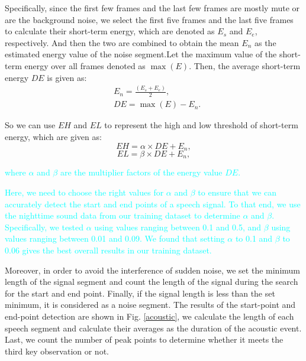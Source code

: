 Specifically, since the first few frames and the last few frames are mostly mute or are the background noise, we select the first five
frames and the last five frames to calculate their short-term energy, which are denoted as $E_s$ and $E_e$, respectively. And then the two
are combined to obtain the mean $E_n$ as the estimated energy value of the noise segment.Let the maximum value of the short-term energy
over all frames denoted as $\max (E)$. Then, the average short-term energy $DE$ is given as:
\begin{eqnarray}
      &E_n = \frac{(E_s+E_e)}{2}, \\
      &DE = \max (E)-E_n.\label{eq:DE}
\end{eqnarray}

So we can use $EH$ and $EL$ to represent the high and low threshold of short-term energy, which are given as:
\begin{equation}
      EH=\alpha \times DE+E_n,
\end{equation}
\begin{equation}
    EL=\beta \times DE+E_n,
\end{equation}

 \textcolor{cyan}{where $\alpha$ and $\beta$ are the multiplier factors of the energy value $DE$.}


\textcolor{cyan}{ Here, we need to choose the right values for $\alpha$ and $\beta$ to ensure
 that we can accurately detect the start and end points of a speech signal. To that end, we use the nighttime sound data from our training dataset to determine $\alpha$ and $\beta$.
 Specifically, we tested $\alpha$ using values ranging between 0.1 and 0.5, and $\beta$ using values ranging between 0.01 and 0.09. We found that setting $\alpha$ to  0.1 and $\beta$ to  0.06 gives the best overall results in our training dataset.
 }

 Moreover, in order to avoid the interference of sudden noise, we set the minimum length of the signal segment and count the length of the signal during the search for the start and end point. Finally, if the signal length is less than the set minimum, it is considered as a noise segment. The results of the start-point and end-point detection are shown in Fig. \ref{acoustic}, we calculate the length of each speech segment and calculate their averages as the duration of the acoustic event. Last, we count the number of peak points to determine whether it meets the third key observation or not.





